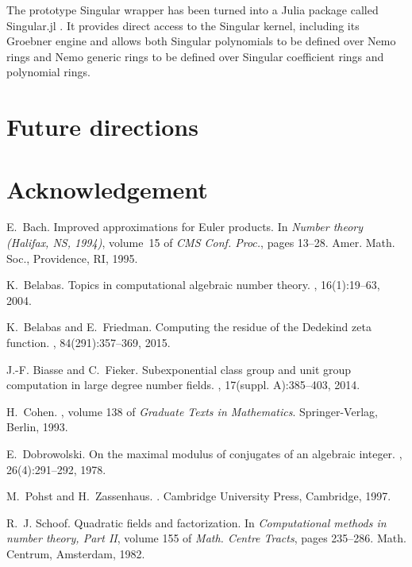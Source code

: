 \documentclass{sig-alternate-05-2015}
\begin{document}
The prototype Singular wrapper has been turned into a Julia package called Singular.jl
\cite{singular.jl}. It provides direct access to the Singular kernel, including its
Groebner engine and allows both Singular polynomials to be defined over Nemo rings and Nemo
generic rings to be defined over Singular coefficient rings and polynomial rings.

\section{Future directions}

\section{Acknowledgement}


\begin{thebibliography}{99}

E.~Bach.
\newblock Improved approximations for {E}uler products.
\newblock In {\em Number theory ({H}alifax, {NS}, 1994)}, volume~15 of {\em CMS
  Conf. Proc.}, pages 13--28. Amer. Math. Soc., Providence, RI, 1995.

K.~Belabas.
\newblock Topics in computational algebraic number theory.
, 16(1):19--63, 2004.

K.~Belabas and E.~Friedman.
\newblock Computing the residue of the {D}edekind zeta function.
, 84(291):357--369, 2015.

J.-F. Biasse and C.~Fieker.
\newblock Subexponential class group and unit group computation in large degree
  number fields.
, 17(suppl. A):385--403, 2014.

H.~Cohen.
, volume 138
  of {\em Graduate Texts in Mathematics}.
\newblock Springer-Verlag, Berlin, 1993.

E.~Dobrowolski.
\newblock On the maximal modulus of conjugates of an algebraic integer.
,
  26(4):291--292, 1978.

M.~Pohst and H.~Zassenhaus.
.
\newblock Cambridge University Press, Cambridge, 1997.

R.~J. Schoof.
\newblock Quadratic fields and factorization.
\newblock In {\em Computational methods in number theory, {P}art {II}}, volume
  155 of {\em Math. Centre Tracts}, pages 235--286. Math. Centrum, Amsterdam,
  1982.


\end{thebibliography}
\end{document}
